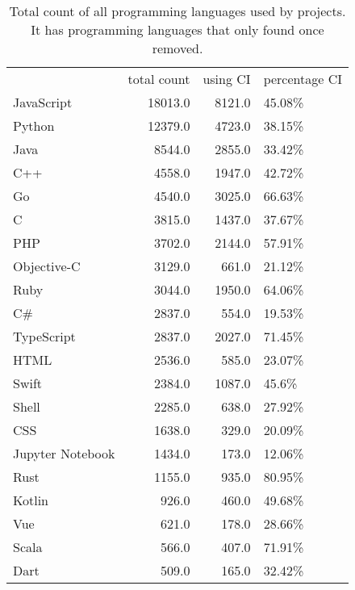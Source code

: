 \begin{table}
\centering
\caption{Total count of all programming languages used by projects. It has programming languages that only found once removed.}
\label{table:languages}
\begin{tabular}{lrrl}
\hline
{} &  total count &  using CI & percentage CI \\

JavaScript       &      18013.0 &    8121.0 &        45.08\% \\
Python           &      12379.0 &    4723.0 &        38.15\% \\
Java             &       8544.0 &    2855.0 &        33.42\% \\
C++              &       4558.0 &    1947.0 &        42.72\% \\
Go               &       4540.0 &    3025.0 &        66.63\% \\
C                &       3815.0 &    1437.0 &        37.67\% \\
PHP              &       3702.0 &    2144.0 &        57.91\% \\
Objective-C      &       3129.0 &     661.0 &        21.12\% \\
Ruby             &       3044.0 &    1950.0 &        64.06\% \\
C\#               &       2837.0 &     554.0 &        19.53\% \\
TypeScript       &       2837.0 &    2027.0 &        71.45\% \\
HTML             &       2536.0 &     585.0 &        23.07\% \\
Swift            &       2384.0 &    1087.0 &         45.6\% \\
Shell            &       2285.0 &     638.0 &        27.92\% \\
CSS              &       1638.0 &     329.0 &        20.09\% \\
Jupyter Notebook &       1434.0 &     173.0 &        12.06\% \\
Rust             &       1155.0 &     935.0 &        80.95\% \\
Kotlin           &        926.0 &     460.0 &        49.68\% \\
Vue              &        621.0 &     178.0 &        28.66\% \\
Scala            &        566.0 &     407.0 &        71.91\% \\
Dart             &        509.0 &     165.0 &        32.42\% \\

\end{tabular}
\end{table}
